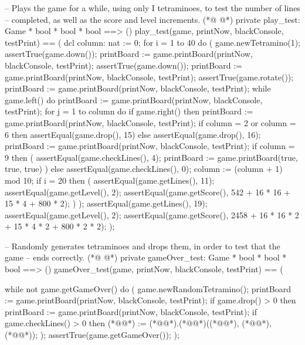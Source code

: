 \begin{vdmpp}[breaklines=true]
  -- Plays the game for a while, using only I tetraminoes, to test the number of lines
  -- completed, as well as the score and level increments.
(*@
\label{play:test:502}
@*)
  private play_test: Game * bool * bool * bool ==> ()
  play_test(game, printNow, blackConsole, testPrint) == (
   dcl column: nat := 0;
   for i = 1 to 40 do (
    game.newTetramino(1);
    assertTrue(game.down());
    printBoard := game.printBoard(printNow, blackConsole, testPrint);
    assertTrue(game.down());
    printBoard := game.printBoard(printNow, blackConsole, testPrint);
    assertTrue(game.rotate());
    printBoard := game.printBoard(printNow, blackConsole, testPrint);
    while game.left() do
     printBoard := game.printBoard(printNow, blackConsole, testPrint);
    for j = 1 to column do
     if game.right() then
      printBoard := game.printBoard(printNow, blackConsole, testPrint);
    if column = 2 or column = 6 then assertEqual(game.drop(), 15)
    else assertEqual(game.drop(), 16);
    printBoard := game.printBoard(printNow, blackConsole, testPrint);
    if column = 9 then (
     assertEqual(game.checkLines(), 4);
     printBoard := game.printBoard(true, true, true)
    )
    else assertEqual(game.checkLines(), 0);
    column := (column + 1) mod 10;
    if i = 20 then (
     assertEqual(game.getLines(), 11);
     assertEqual(game.getLevel(), 2);
     assertEqual(game.getScore(), 542 + 16 * 16 + 15 * 4 + 800 * 2);
    )
   );
   assertEqual(game.getLines(), 19);
   assertEqual(game.getLevel(), 2);
   assertEqual(game.getScore(), 2458 + 16 * 16 * 2 + 15 * 4 * 2 + 800 * 2 * 2);
  ); 
  
  -- Randomly generates tetraminoes and drops them, in order to test that the game
  -- ends correctly.
(*@
\label{gameOver:test:540}
@*)
  private gameOver_test: Game * bool * bool * bool ==> ()
  gameOver_test(game, printNow, blackConsole, testPrint) == (
  
   while not game.getGameOver() do (
    game.newRandomTetramino();
    printBoard := game.printBoard(printNow, blackConsole, testPrint);
    if game.drop() > 0 
    then printBoard := game.printBoard(printNow, blackConsole, testPrint);
    if game.checkLines() > 0
    then (*@@*) := (*@@*).(*@@*)((*@@*), (*@@*), (*@@*));
   );
   assertTrue(game.getGameOver());
  );


\end{vdmpp}

